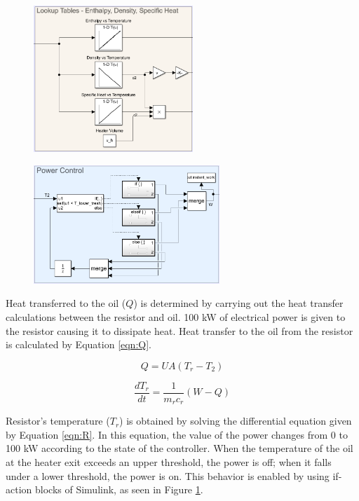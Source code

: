 \begin{figure}[h]
    \begin{minipage}{.5\textwidth}
        \centering
        \includegraphics[width=6cm]{images/lookup.png}
        \label{fig:lookup}
    \end{minipage}
    \begin{minipage}{.4\textwidth}
        \centering
        \includegraphics[width=7cm]{images/power.png}
        \label{fig:power}
    \end{minipage}
\end{figure}

\par
Heat transferred to the oil ($Q$) is determined by carrying out the heat transfer calculations between the resistor and oil. 100 kW of electrical power is given to the resistor causing it to dissipate heat. Heat transfer\cite{incropera} to the oil from the resistor is calculated by Equation \ref{eqn:Q}.

\begin{equation}
    \label{eqn:Q}
    Q = UA(T_{r} - T_{2})
\end{equation}

\begin{equation}
    \label{eqn:R}
    \frac{dT_{r}}{dt} = \frac{1}{m_{r}c_{r}}(W - Q) 
\end{equation}

\par
Resistor's temperature ($T_{r}$) is obtained by solving the differential equation given by Equation \ref{eqn:R}. In this equation, the value of the power changes from 0 to 100 kW according to the state of the controller. When the temperature of the oil at the heater exit exceeds an upper threshold, the power is off; when it falls under a lower threshold, the power is on. This behavior is enabled by using if-action blocks of Simulink, as seen in Figure \ref{fig:power}.


